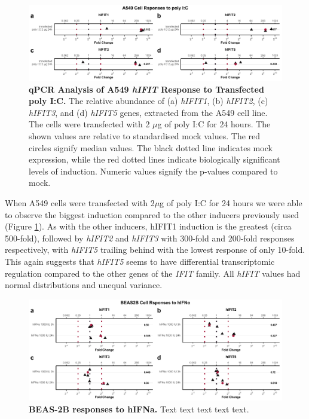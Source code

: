 \begin{figure}
    \centering
    \includegraphics[width=1\linewidth]{06. Chapter 1/Figs/01. Induction/04. a549_treat_polyic.pdf}
    \caption[qPCR Analysis of A549 \textit{hIFIT} Response to Transfected poly I:C.]{\textbf{qPCR Analysis of A549 \textit{hIFIT} Response to Transfected poly I:C.} The relative abundance of (a) \textit{hIFIT1}, (b) \textit{hIFIT2}, (c) \textit{hIFIT3}, and (d) \textit{hIFIT5} genes, extracted from the A549 cell line. The cells were transfected with 2 \(\mu\)g of poly I:C for 24 hours. The shown values are relative to standardised mock values. The red circles signify median values. The black dotted line indicates mock expression, while the red dotted lines indicate biologically significant levels of induction. Numeric values signify the p-values compared to mock.}
    \label{A549 Response to poly I:C}
\end{figure}

When A549 cells were transfected with 2\(\mu\)g of poly I:C for 24 hours we were able to observe the biggest induction compared to the other inducers previously used (Figure \ref{A549 Response to poly I:C}). As with the other inducers, hIFIT1 induction is the greatest (circa 500-fold), followed by \textit{hIFIT2} and \textit{hIFIT3} with 300-fold and 200-fold responses respectively, with \textit{hIFIT5} trailing behind with the lowest response of only 10-fold. This again suggests that \textit{hIFIT5} seems to have differential transcriptomic regulation compared to the other genes of the \textit{IFIT} family. All \textit{hIFIT} values had normal distributions and unequal variance.

\begin{figure}
    \centering
    \includegraphics[width=1\linewidth]{06. Chapter 1/Figs/01. Induction/09. beas2b_ifna.pdf}
    \caption[BEAS-2B responses to hIFNa.]{\textbf{BEAS-2B responses to hIFNa.} Text text text text text.}
    \label{BEAS-2B responses to hIFNa.}
\end{figure}

